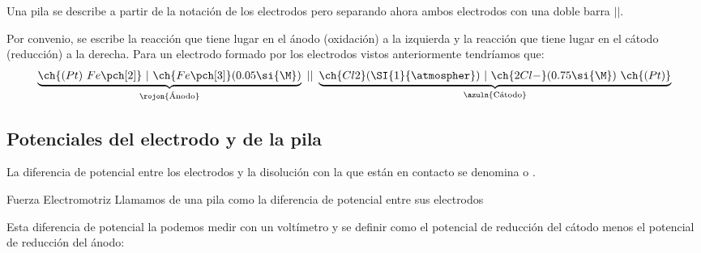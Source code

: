     Una pila se describe a partir de la notación de los electrodos pero separando ahora ambos electrodos con una doble barra \(||\).

    Por convenio, se escribe la reacción que tiene lugar en el ánodo (oxidación) a la izquierda y la reacción que tiene lugar en el cátodo (reducción) a la derecha.
    Para un electrodo formado por los electrodos vistos anteriormente tendríamos que:
    \begin{equation*}
        \underbrace{\ch{(Pt)\  Fe\pch[2]}\ |\ \ch{Fe\pch[3]} (0.05 \si{\M})}_{\text{\rojon{Ánodo}}}  \ || \ \underbrace{\ch{Cl2} (\SI{1}{\atmospher})\ | \ \ch{2 Cl-} (0.75 \si{\M})\ \ch{(Pt)}}_{\text{\azuln{Cátodo}}}
    \end{equation*}



    \subsection{Potenciales del electrodo y de la pila}\label{subsec:potenciales-del-electrodo-y-de-la-pila}

    La diferencia de potencial entre los electrodos y la disolución con la que están en contacto se denomina  o .

    \begin{center}
        \begin{definicion}[width=0.9\textwidth]{Fuerza Electromotriz}
            Llamamos  de una pila como la diferencia de potencial entre sus electrodos
        \end{definicion}
    \end{center}


    Esta diferencia de potencial la podemos medir con un voltímetro y se definir como el potencial de reducción del cátodo menos el potencial de reducción del ánodo:

